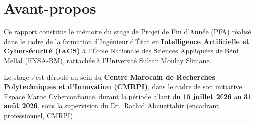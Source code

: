 \documentclass[12pt, a4paper, oneside]{report}
\begin{document}
\begin{titlepage}
\end{titlepage}




\chapter*{Avant-propos}

Ce rapport constitue le mémoire du stage de Projet de Fin d'Année (PFA) réalisé dans le cadre de la formation d'Ingénieur d'État en \textbf{Intelligence Artificielle et Cybersécurité (IACS)} à l'École Nationale des Sciences Appliquées de Béni Mellal (ENSA-BM), rattachée à l'Université Sultan Moulay Slimane.

Le stage s'est déroulé au sein du \textbf{Centre Marocain de Recherches Polytechniques et d'Innovation (CMRPI)}, dans le cadre de son initiative Espace Maroc Cyberconfiance, durant la période allant du \textbf{15 juillet 2026} au \textbf{31 août 2026}, sous la supervision du Dr.~Rachid Abouettahir (encadrant professionnel, CMRPI).
\end{document}
